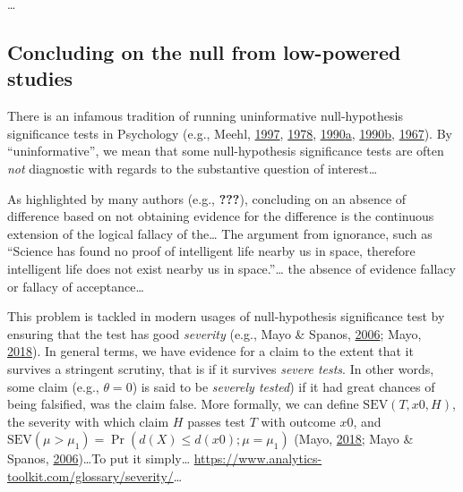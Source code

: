 \documentclass[
  english,
  man,floatsintext]{apa6}
\begin{document}
\ldots{}

\hypertarget{concluding-on-the-null-from-low-powered-studies}{%
\subsection{Concluding on the null from low-powered studies}\label{concluding-on-the-null-from-low-powered-studies}}

There is an infamous tradition of running uninformative null-hypothesis significance tests in Psychology (e.g., Meehl, \protect\hyperlink{ref-harlow_problem_1997}{1997}, \protect\hyperlink{ref-meehl_theoretical_1978}{1978}, \protect\hyperlink{ref-meehl_why_1990}{1990}\protect\hyperlink{ref-meehl_why_1990}{a}, \protect\hyperlink{ref-meehl_appraising_1990-1}{1990}\protect\hyperlink{ref-meehl_appraising_1990-1}{b}, \protect\hyperlink{ref-meehl_theory-testing_1967}{1967}). By ``uninformative'', we mean that some null-hypothesis significance tests are often \emph{not} diagnostic with regards to the substantive question of interest\ldots{}

As highlighted by many authors (e.g., {\textbf{???}}), concluding on an absence of difference based on not obtaining evidence for the difference is the continuous extension of the logical fallacy of the\ldots{} The argument from ignorance, such as ``Science has found no proof of intelligent life nearby us in space, therefore intelligent life does not exist nearby us in space.''\ldots{} the absence of evidence fallacy or fallacy of acceptance\ldots{}

This problem is tackled in modern usages of null-hypothesis significance test by ensuring that the test has good \emph{severity} (e.g., Mayo \& Spanos, \protect\hyperlink{ref-mayo_severe_2006}{2006}; Mayo, \protect\hyperlink{ref-mayo_statistical_2018}{2018}). In general terms, we have evidence for a claim to the extent that it survives a stringent scrutiny, that is if it survives \emph{severe tests}. In other words, some claim (e.g., \(\theta = 0\)) is said to be \emph{severely tested}) if it had great chances of being falsified, was the claim false. More formally, we can define \(\text{SEV}(T, x0, H)\), the severity with which claim \(H\) passes test \(T\) with outcome \(x0\), and \(\text{SEV}(\mu > \mu_{1}) = \Pr(d(X) \leq d(x0); \mu = \mu_{1})\) (Mayo, \protect\hyperlink{ref-mayo_statistical_2018}{2018}; Mayo \& Spanos, \protect\hyperlink{ref-mayo_severe_2006}{2006})\ldots To put it simply\ldots{} \url{https://www.analytics-toolkit.com/glossary/severity/}\ldots{}
\end{document}
